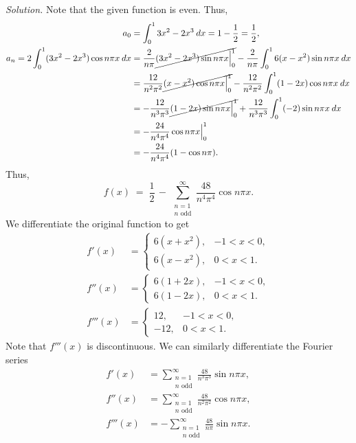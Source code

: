 \documentclass[10pt]{article}
\begin{document}
        \textit{Solution.}
        Note that the given function is even. Thus,
        \begin{align*}
                a_0 &= \int_0^1 3x^2 - 2x^3\:dx = 1 - \frac{1}{2} = \frac{1}{2}, \\
                a_n = 2\int_0^1 (3x^2 - 2x^3)\cos{n\pi x}\:dx &= \frac{2}{n\pi}\cancel{(3x^2 - 2x^3)\sin{n\pi x}\Big|_0^1}
                        - \frac{2}{n\pi}\int_0^1 6(x - x^2)\sin{n\pi x}\:dx \\
                        &= \frac{12}{n^2\pi^2}\cancel{(x - x^2)\cos{n\pi x}\Big|_0^1} - \frac{12}{n^2\pi^2}\int_0^1(1 - 2x)\cos{n\pi x}\:dx \\
                        &= -\frac{12}{n^3\pi^3}\cancel{(1 - 2x)\sin{n\pi x}\Big|_0^1} + \frac{12}{n^3\pi^3}\int_0^1(-2)\sin{n\pi x}\:dx \\
                        &= -\frac{24}{n^4\pi^4}\cos{n\pi x}\Big|_0^1 \\
                        &= -\frac{24}{n^4\pi^4}(1 - \cos{n\pi}).
        \end{align*}
        Thus,
        \[
                f(x) \;=\; \frac{1}{2} \,-\, \sum_{\substack{n = 1 \\ n\text{ odd}}}^\infty \frac{48}{n^4\pi^4}\cos{n\pi x}.
        \]
        We differentiate the original function to get
        \begin{align*}
                f'(x) &= \begin{cases}
                        6(x + x^2), & -1 < x < 0, \\
                        6(x - x^2), & 0 < x < 1.
                \end{cases} \\
                f''(x) &= \begin{cases}
                        6(1 + 2x), & -1 < x < 0, \\
                        6(1 - 2x), & 0 < x < 1.
                \end{cases} \\
                f'''(x) &= \begin{cases}
                        12, & -1 < x < 0, \\
                        -12, & 0 < x < 1.
                \end{cases}
        \end{align*}
        Note that $f'''(x)$ is discontinuous. We can similarly differentiate the Fourier series
        \begin{align*}
                f'(x) &= \sum_{\substack{n = 1 \\ n\text{ odd}}}^\infty \frac{48}{n^3\pi^3} \sin{n\pi x}, \\
                f''(x) &= \sum_{\substack{n = 1 \\ n\text{ odd}}}^\infty \frac{48}{n^2\pi^2} \cos{n\pi x}, \\
                f'''(x) &= -\sum_{\substack{n = 1 \\ n\text{ odd}}}^\infty \frac{48}{n\pi} \sin{n\pi x}.
        \end{align*}
\end{document}
